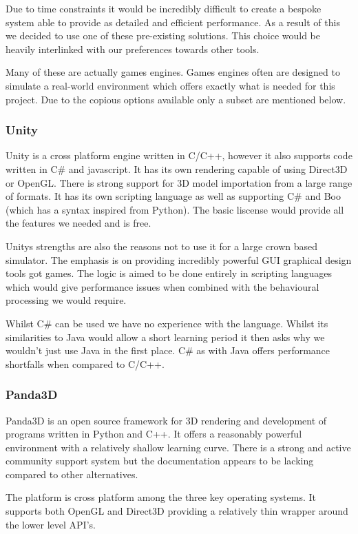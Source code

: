 Due to time constraints it would be incredibly difficult to create
a bespoke system able to provide as detailed and efficient performance.
As a result of this we decided to use one of these pre-existing solutions.
This choice would be heavily interlinked with our preferences towards
other tools.

Many of these are actually games engines. Games engines often are
designed to simulate a real-world environment which offers exactly
what is needed for this project. Due to the copious options available
only a subset are mentioned below.


\subsubsection{Unity }

Unity is a cross platform engine written in C/C++, however it also
supports code written in C\# and javascript. It has its own rendering
capable of using Direct3D or OpenGL. There is strong support for 3D
model importation from a large range of formats. It has its own scripting
language as well as supporting C\# and Boo (which has a syntax inspired
from Python). The basic liscense would provide all the features we
needed and is free.

Unitys strengths are also the reasons not to use it for a large crown
based simulator. The emphasis is on providing incredibly powerful
GUI graphical design tools got games. The logic is aimed to be done
entirely in scripting languages which would give performance issues
when combined with the behavioural processing we would require.

Whilst C\# can be used we have no experience with the language. Whilst
its similarities to Java would allow a short learning period it then
asks why we wouldn't just use Java in the first place. C\# as with
Java offers performance shortfalls when compared to C/C++.


\subsubsection{Panda3D}

Panda3D is an open source framework for 3D rendering and development
of programs written in Python and C++. It offers a reasonably powerful
environment with a relatively shallow learning curve. There is a strong
and active community support system but the documentation appears
to be lacking compared to other alternatives.

The platform is cross platform among the three key operating systems.
It supports both OpenGL and Direct3D providing a relatively thin wrapper
around the lower level API's.


